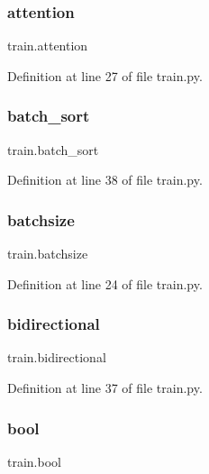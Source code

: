 \subsubsection{\texorpdfstring{attention}{attention}}
{\footnotesize\ttfamily train.\+attention}



Definition at line 27 of file train.\+py.

\mbox{\label{namespacetrain_a8f8ae5db269e571fc4532a922fd3afa4}} 
\subsubsection{\texorpdfstring{batch\+\_\+sort}{batch\_sort}}
{\footnotesize\ttfamily train.\+batch\+\_\+sort}



Definition at line 38 of file train.\+py.

\mbox{\label{namespacetrain_a73378d30d3edb0d9bf4ce7188c42c086}} 
\subsubsection{\texorpdfstring{batchsize}{batchsize}}
{\footnotesize\ttfamily train.\+batchsize}



Definition at line 24 of file train.\+py.

\mbox{\label{namespacetrain_a991d5bc473da1d057a2010f35dbd198b}} 
\subsubsection{\texorpdfstring{bidirectional}{bidirectional}}
{\footnotesize\ttfamily train.\+bidirectional}



Definition at line 37 of file train.\+py.

\mbox{\label{namespacetrain_a366f6877ee8e22a2c2aa569859925e34}} 
\subsubsection{\texorpdfstring{bool}{bool}}
{\footnotesize\ttfamily train.\+bool}



